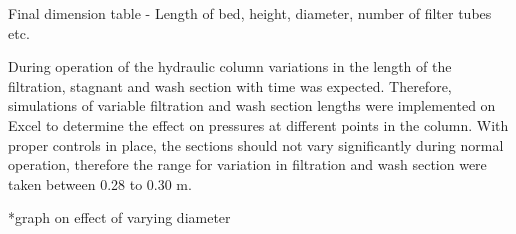 Final dimension table - Length of bed, height, diameter, number of filter tubes etc. 

During operation of the hydraulic column  variations in the length of the filtration, stagnant and wash section with time was expected. Therefore, simulations of variable filtration and wash section lengths were implemented on Excel to determine the effect on pressures at different points in the column. With proper controls in place, the sections should not vary significantly during normal operation, therefore the range for variation in filtration and wash section were taken between 0.28 to 0.30 m.  

*graph on effect of varying diameter 


